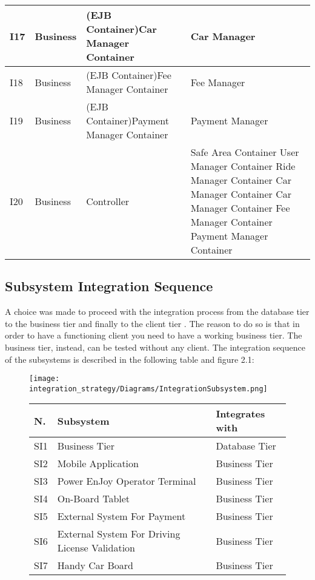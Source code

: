 \begin{longtable}{| m{1cm}| m{} | m{4cm} | m{} | }
\hline
I17 & Business & (EJB Container)Car Manager Container & Car Manager\\
\hline
I18 & Business & (EJB Container)Fee Manager Container & Fee Manager\\
\hline
I19 & Business & (EJB Container)Payment Manager Container & Payment Manager\\
\hline
I20 & Business & Controller & Safe Area Container \newline User Manager Container \newline Ride Manager Container \newline Car Manager Container \newline Car Manager Container \newline Fee Manager Container \newline Payment Manager Container\\
\hline
\end{longtable}

\subsection{Subsystem Integration Sequence}
A choice was made to proceed with the integration process from the database tier to the business tier and finally to the client tier . The reason to do so is that in order to have a functioning client you need to have a working business tier. The business tier, instead, can be tested without any client. 
The integration sequence of the subsystems is described in the following table and figure 2.1:
\begin{figure}
	\centering
	\texttt{[image: integration\_strategy/Diagrams/IntegrationSubsystem.png]}
	\caption{Order of integration of the subsystems.}
	\label{fig:subsystems}
		
\begin{longtable}{| m{1cm}| m{4cm}| m{4cm} | }
\hline
\textbf{N.} & \textbf{Subsystem} & \textbf{Integrates with}\\
\hline
SI1 & Business Tier & Database Tier\\
\hline
SI2 & Mobile Application & Business Tier\\
\hline
SI3 & Power EnJoy Operator Terminal & Business Tier\\
\hline
SI4 & On-Board Tablet & Business Tier\\
\hline
SI5 & External System For Payment & Business Tier\\
\hline
SI6 & External System For Driving License Validation & Business Tier\\
\hline
SI7 & Handy Car Board & Business Tier\\
\hline
\end{longtable}


\end{figure}

